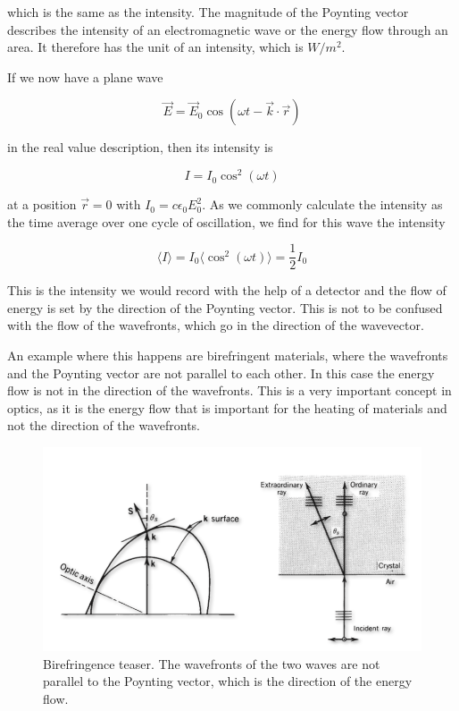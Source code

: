 \documentclass[
  a4paper,
]{book}
\begin{document}
which is the same as the intensity. The magnitude of the Poynting vector
describes the intensity of an electromagnetic wave or the energy flow
through an area. It therefore has the unit of an intensity, which is
\(W/m^2\).

If we now have a plane wave

\[
\vec{E}=\vec{E}_0\cos(\omega t -\vec{k}\cdot\vec{r})
\]

in the real value description, then its intensity is

\[
I=I_0\cos^2(\omega t)
\]

at a position \(\vec{r}=0\) with \(I_0=c\epsilon_0 E_0^2\). As we
commonly calculate the intensity as the time average over one cycle of
oscillation, we find for this wave the intensity

\[
\langle I \rangle =I_0\langle\cos^2(\omega t) \rangle =\frac{1}{2}I_0
\]

This is the intensity we would record with the help of a detector and
the flow of energy is set by the direction of the Poynting vector. This
is not to be confused with the flow of the wavefronts, which go in the
direction of the wavevector.

An example where this happens are birefringent materials, where the
wavefronts and the Poynting vector are not parallel to each other. In
this case the energy flow is not in the direction of the wavefronts.
This is a very important concept in optics, as it is the energy flow
that is important for the heating of materials and not the direction of
the wavefronts.

\begin{figure}[H]

{\centering \includegraphics[width=0.7\linewidth,height=\textheight,keepaspectratio]{electromagnetic-waves/img/birefringence.png}

}

\caption{Birefringence teaser. The wavefronts of the two waves are not
parallel to the Poynting vector, which is the direction of the energy
flow.}

\end{figure}%
\end{document}

